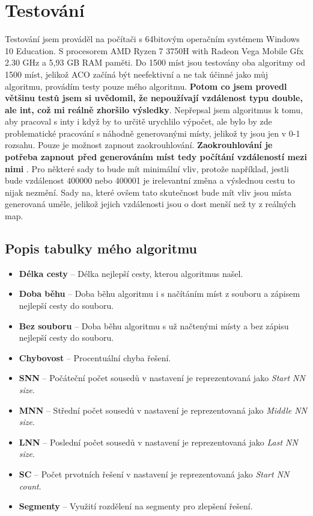 \chapter{Testování} Testování jsem prováděl na počítači s 64bitovým operačním systémem Windows 10 Education. S procesorem AMD Ryzen 7 3750H with Radeon Vega Mobile Gfx 2.30 GHz a 5,93 GB RAM paměti. Do 1500 míst jsou testovány oba algoritmy od 1500 míst, jelikož ACO začíná být neefektivní a ne tak účinné jako můj algoritmu, provádím testy pouze mého algoritmu. \textbf{Potom co jsem provedl většinu testů jsem si uvědomil, že nepoužívají vzdálenost typu double, ale int, což mi reálně zhoršilo výsledky}. Nepřepsal jsem algoritmus k tomu, aby pracoval s inty i když by to určitě urychlilo výpočet, ale bylo by zde problematické pracování s náhodně generovanými místy, jelikož ty jsou jen v 0-1 rozsahu. Pouze je možnost zapnout zaokrouhlování. \textbf{Zaokrouhlování je potřeba zapnout před generováním míst tedy počítání vzdáleností mezi nimi} . Pro některé sady to bude mít minimální vliv, protože například, jestli bude vzdálenost 400000 nebo 400001 je irelevantní změna a výslednou cestu to nijak nezmění. Sady na, které ovšem tato skutečnost bude mít vliv jsou místa generovaná uměle, jelikož jejich vzdálenosti jsou o dost menší než ty z reálných map.  
\section{Popis tabulky mého algoritmu}
\begin{itemize}
    \item \textbf{Délka cesty} -- Délka nejlepší cesty, kterou algoritmus našel. 
    \item \textbf{Doba běhu} -- Doba běhu algoritmu i s načítáním míst z souboru a zápisem nejlepší cesty do souboru. 
    \item \textbf{Bez souboru} -- Doba běhu algoritmu s už načtenými místy a bez zápisu nejlepší cesty do souboru. 
    \item \textbf{Chybovost} -- Procentuální chyba řešení.
    \item \textbf{SNN} -- Počáteční počet sousedů v nastavení je reprezentovaná jako \textit{Start NN size}.
    \item \textbf{MNN} -- Střední počet sousedů v nastavení je reprezentovaná jako \textit{Middle NN size}.
    \item \textbf{LNN} -- Poslední počet sousedů v nastavení je reprezentovaná jako \textit{Last NN size}.
    \item \textbf{SC} -- Počet prvotních řešení v nastavení je reprezentovaná jako \textit{Start NN count}.
    \item \textbf{Segmenty} -- Využití rozdělení na segmenty pro zlepšení řešení.
\end{itemize}

